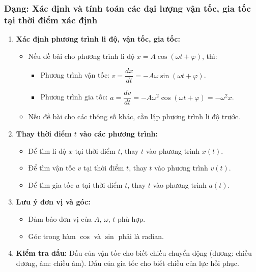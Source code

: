 \subsubsection{Dạng: Xác định và tính toán các đại lượng vận tốc, gia tốc tại thời điểm xác định}
\begin{phuongphap}
\begin{enumerate}
    \item \textbf{Xác định phương trình li độ, vận tốc, gia tốc:}
    \begin{itemize}
        \item Nếu đề bài cho phương trình li độ $x = A\cos(\omega t + \varphi)$, thì:
        \begin{itemize}
            \item Phương trình vận tốc: $v = \dfrac{dx}{dt} = -A\omega\sin(\omega t + \varphi)$.
            \item Phương trình gia tốc: $a = \dfrac{dv}{dt} = -A\omega^2\cos(\omega t + \varphi) = -\omega^2 x$.
        \end{itemize}
        \item Nếu đề bài cho các thông số khác, cần lập phương trình li độ trước.
    \end{itemize}
    \item \textbf{Thay thời điểm $t$ vào các phương trình:}
    \begin{itemize}
        \item Để tìm li độ $x$ tại thời điểm $t$, thay $t$ vào phương trình $x(t)$.
        \item Để tìm vận tốc $v$ tại thời điểm $t$, thay $t$ vào phương trình $v(t)$.
        \item Để tìm gia tốc $a$ tại thời điểm $t$, thay $t$ vào phương trình $a(t)$.
    \end{itemize}
    \item \textbf{Lưu ý đơn vị và góc:}
    \begin{itemize}
        \item Đảm bảo đơn vị của $A$, $\omega$, $t$ phù hợp.
        \item Góc trong hàm $\cos$ và $\sin$ phải là radian.
    \end{itemize}
    \item \textbf{Kiểm tra dấu:} Dấu của vận tốc cho biết chiều chuyển động (dương: chiều dương, âm: chiều âm). Dấu của gia tốc cho biết chiều của lực hồi phục.
\end{enumerate}
\end{phuongphap}
